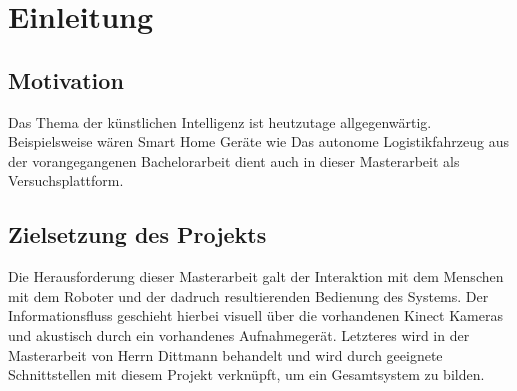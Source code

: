 
\chapter{Einleitung}
\label{ch: Einleitung}
	
	\section{Motivation}
	\label{sec: Motivation}
		Das Thema der künstlichen Intelligenz ist heutzutage allgegenwärtig. Beispielsweise wären Smart Home Geräte wie 
		Das autonome Logistikfahrzeug aus der vorangegangenen Bachelorarbeit dient auch in dieser Masterarbeit als Versuchsplattform. 
	
	\section{Zielsetzung des Projekts}
		Die Herausforderung dieser Masterarbeit galt der Interaktion mit dem Menschen mit dem Roboter und der dadruch resultierenden Bedienung des Systems. Der Informationsfluss geschieht hierbei visuell über die vorhandenen Kinect Kameras und akustisch durch ein vorhandenes Aufnahmegerät. Letzteres wird in der Masterarbeit von Herrn Dittmann behandelt und wird durch geeignete Schnittstellen mit diesem Projekt verknüpft, um ein Gesamtsystem zu bilden.
	